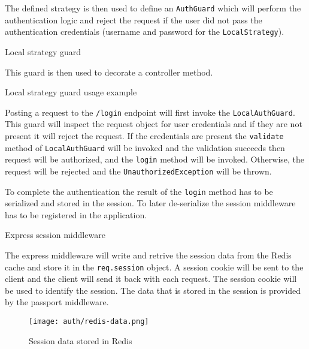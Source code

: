 \documentclass[../main.tex]{subfiles}
\begin{document}
The defined strategy is then used to define an \texttt{AuthGuard} which will perform the authentication logic and reject the request if the user
did not pass the authentication credentials (username and password for the \texttt{LocalStrategy}).

\begin{listing}[H]
  \caption{Local strategy guard}
\end{listing}

This guard is then used to decorate a controller method.

\begin{listing}[H]
  \caption{Local strategy guard usage example}
  \label{code:local-guard-usage}
\end{listing}

Posting a request to the \texttt{/login} endpoint will first invoke the \texttt{LocalAuthGuard}.
This guard will inspect the request object for user credentials and if they are not present it will reject the request.
If the credentials are present the \texttt{validate} method of \texttt{LocalAuthGuard} will be invoked and the validation succeeds then request will be authorized, and the
\texttt{login} method will be invoked. Otherwise, the request will be rejected and the \texttt{UnauthorizedException} will be thrown.

To complete the authentication the result of the \texttt{login} method has to be serialized and stored in the session.
To later de-serialize the session middleware has to be registered in the application.

\begin{listing}[H]
  \caption{Express session middleware}
\end{listing}

The express middleware will write and retrive the session data from the Redis cache and store it in the \texttt{req.session} object.
A session cookie will be sent to the client and the client will send it back with each request. The session cookie will be used to identify the session.
The data that is stored in the session is provided by the passport middleware.

\begin{figure}[H]
  \centering
  \texttt{[image: auth/redis-data.png]}
  \caption{Session data stored in Redis}
\end{figure}
\end{document}
